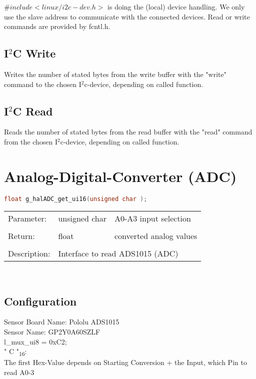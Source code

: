 $\#include <linux/i2c-dev.h>$ is doing the (local) device handling. We only use the slave address to communicate with the connected devices. Read or write commands are provided by fcntl.h.

\subsection{I$^2$C Write}

Writes the number of stated bytes from the write buffer with the "write" command to the chosen I$^2$c-device, depending on called function.

\subsection{I$^2$C Read}

Reads the number of stated bytes from the read buffer with the "read" command from the chosen I$^2$c-device, depending on called function.



\newpage
\section{Analog-Digital-Converter (ADC)}

\begin{lstlisting}[language=C, basicstyle=\small, caption=Read from ADC]
float g_halADC_get_ui16(unsigned char );
\end{lstlisting}


\begin{tabular}{lll}
Parameter: & unsigned char & A0-A3 input selection\\
					 &	\\
Return: & float & converted analog values\\
							&&\\
Description: & \multicolumn{2}{l}{Interface to read ADS1015 (ADC)}\\
\end{tabular}
\\


\subsection{Configuration}

Sensor Board Name: Pololu ADS1015\\
Sensor Name: GP2Y0A60SZLF\\

l\_mux\_ui8 = 0xC2;\\
" C "\textsubscript{16}:\\
The first Hex-Value depends on Starting Conversion + the Input, which Pin to read A0-3

